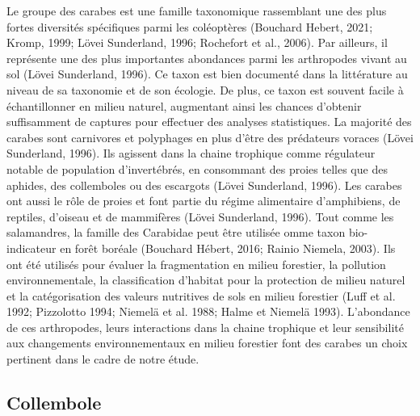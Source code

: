Le groupe des carabes est une famille taxonomique rassemblant une des plus fortes diversités spécifiques parmi les coléoptères 
(Bouchard Hebert, 2021; Kromp, 1999; Lövei Sunderland, 1996; Rochefort et al., 2006). 
Par ailleurs, il représente une des plus importantes abondances parmi les arthropodes vivant au sol (Lövei Sunderland, 1996). 
Ce taxon est bien documenté dans la littérature au niveau de sa taxonomie et de son écologie. De plus, 
ce taxon est souvent facile à échantillonner en milieu naturel, augmentant ainsi les chances d’obtenir suffisamment de captures pour effectuer 
des analyses statistiques. La majorité des carabes sont carnivores et polyphages en plus d’être des prédateurs voraces (Lövei Sunderland, 1996). 
Ils agissent dans la chaine trophique comme régulateur notable de population d’invertébrés, en consommant des proies telles que des aphides, des 
collemboles ou des escargots (Lövei Sunderland, 1996). Les carabes ont aussi le rôle de proies et font partie du régime alimentaire d’amphibiens, 
de reptiles, d’oiseau et de mammifères (Lövei Sunderland, 1996). Tout comme les salamandres, la famille des Carabidae peut être utilisée 
omme taxon bio-indicateur en forêt boréale (Bouchard Hébert, 2016; Rainio Niemela, 2003). Ils ont été utilisés pour évaluer la fragmentation en milieu 
forestier, la pollution environnementale, la classification d’habitat pour la protection de milieu naturel et la catégorisation des valeurs nutritives de sols 
en milieu forestier (Luff et al. 1992; Pizzolotto 1994; Niemelä et al. 1988; Halme et Niemelä 1993). L’abondance de ces arthropodes, 
leurs interactions dans la chaine trophique et leur sensibilité aux changements environnementaux en milieu forestier font des carabes un choix 
pertinent dans le cadre de notre étude. 

\subsection*{Collembole}

